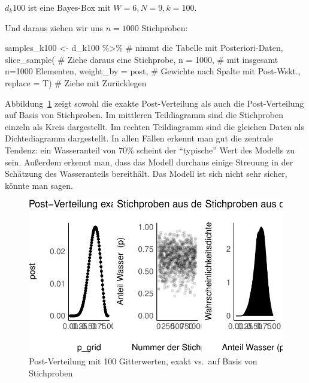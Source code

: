 \documentclass[
  a4paper,
  DIV=11]{scrreprt}
\newenvironment{Shaded}{\begin{snugshade}}{\end{snugshade}}
\newcommand{\AttributeTok}[1]{\textcolor[rgb]{0.40,0.45,0.13}{#1}}
\newcommand{\CommentTok}[1]{\textcolor[rgb]{0.37,0.37,0.37}{#1}}
\newcommand{\DecValTok}[1]{\textcolor[rgb]{0.68,0.00,0.00}{#1}}
\newcommand{\FunctionTok}[1]{\textcolor[rgb]{0.28,0.35,0.67}{#1}}
\newcommand{\NormalTok}[1]{\textcolor[rgb]{0.00,0.23,0.31}{#1}}
\newcommand{\OtherTok}[1]{\textcolor[rgb]{0.00,0.23,0.31}{#1}}
\newcommand{\SpecialCharTok}[1]{\textcolor[rgb]{0.37,0.37,0.37}{#1}}
\theoremstyle{definition}
\theoremstyle{remark}
\begin{document}
\(d_k100\) ist eine Bayes-Box mit \(W=6, N=9, k=100\).

Und daraus ziehen wir uns \(n=1000\) Stichproben:

\begin{Shaded}
\begin{Highlighting}[]
\NormalTok{samples\_k100 }\OtherTok{\textless{}{-}}
\NormalTok{  d\_k100 }\SpecialCharTok{\%\textgreater{}\%}  \CommentTok{\# nimmt die Tabelle mit Posteriori{-}Daten,}
  \FunctionTok{slice\_sample}\NormalTok{(  }\CommentTok{\# Ziehe daraus eine Stichprobe,}
    \AttributeTok{n =} \DecValTok{1000}\NormalTok{,  }\CommentTok{\# mit insgesamt n=1000 Elementen,}
    \AttributeTok{weight\_by =}\NormalTok{ post,  }\CommentTok{\# Gewichte nach Spalte mit Post{-}Wskt.,}
    \AttributeTok{replace =}\NormalTok{ T)  }\CommentTok{\# Ziehe mit Zurücklegen}
\end{Highlighting}
\end{Shaded}

Abbildung~\ref{fig-post100} zeigt sowohl die exakte Post-Verteilung als
auch die Post-Verteilung auf Basis von Stichproben. Im mittleren
Teildiagramm sind die Stichproben einzeln als Kreis dargestellt. Im
rechten Teildiagramm sind die gleichen Daten als Dichtediagramm
dargestellt. In allen Fällen erkennt man gut die zentrale Tendenz: ein
Wasseranteil von 70\% scheint der ``typische'' Wert des Modells zu sein.
Außerdem erkennt man, dass das Modell durchaus einige Streuung in der
Schätzung des Wasseranteils bereithält. Das Modell ist sich nicht sehr
sicher, könnte man sagen.

\begin{figure}

{\centering \includegraphics{./Post_files/figure-pdf/fig-post100-1.pdf}

}

\caption{\label{fig-post100}Post-Verteilung mit 100 Gitterwerten, exakt
vs.~auf Basis von Stichproben}

\end{figure}
\end{document}
